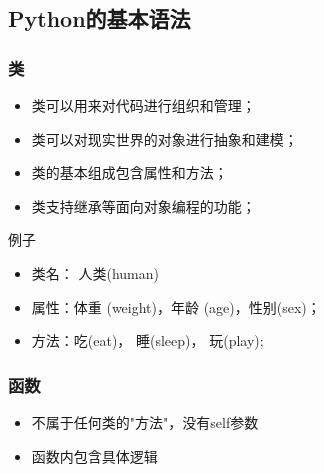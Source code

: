 \documentclass[11pt]{beamer}
\begin{document}
\subsection{Python的基本语法}
\begin{frame}[fragile]
\frametitle{类}
\begin{minipage}[t]{0.5\linewidth}
	\begin{itemize}
	\item 类可以用来对代码进行组织和管理；
	\item 类可以对现实世界的对象进行抽象和建模；
	\item 类的基本组成包含属性和方法；
	\item 类支持继承等面向对象编程的功能；
\end{itemize}

例子
\begin{itemize}
	\item 类名： 人类(human)
	\item 属性：体重 (weight)，年龄 (age)，性别(sex)；
	\item 方法：吃(eat)， 睡(sleep)， 玩(play);
\end{itemize}
\end{minipage}%
\begin{minipage}[t]{0.05\linewidth}
	\quad
\end{minipage}%
	\begin{minipage}[t]{0.4\linewidth}
	\begin{figure}
			
	\end{figure}
\end{minipage}
\end{frame}

\begin{frame}[fragile]
	\frametitle{函数}
	\begin{minipage}[t]{0.4\linewidth}
	\begin{itemize}
	\item 不属于任何类的"方法"，没有self参数
	\item 函数内包含具体逻辑
\end{itemize}
	\end{minipage}%
	\begin{minipage}[t]{0.05\linewidth}
		\quad 	%
	\end{minipage}%
	\begin{minipage}[t]{0.5\linewidth}
		
	
		
	\end{minipage}
\end{frame}
\end{document}
